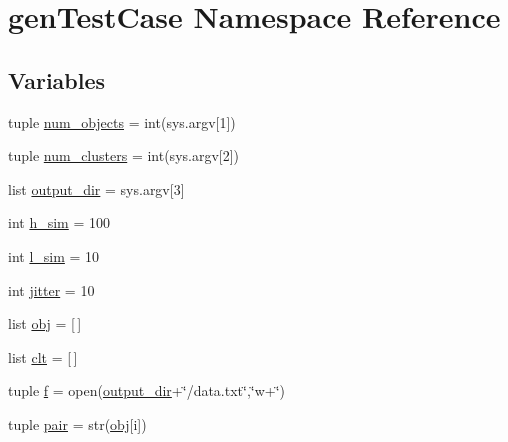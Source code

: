 \hypertarget{namespacegenTestCase}{\section{gen\-Test\-Case Namespace Reference}
\label{namespacegenTestCase}
}
\subsection*{Variables}
\begin{DoxyCompactItemize}
\item 
tuple \hyperlink{namespacegenTestCase_aae9a7a96491ccd585c9d67ee2aff7387}{num\-\_\-objects} = int(sys.\-argv\mbox{[}1\mbox{]})
\item 
tuple \hyperlink{namespacegenTestCase_a0fe831ca87bbbde19c8e0145cc350cc5}{num\-\_\-clusters} = int(sys.\-argv\mbox{[}2\mbox{]})
\item 
list \hyperlink{namespacegenTestCase_aa8a0b42d363ab3e8c59ab0514e6a4f21}{output\-\_\-dir} = sys.\-argv\mbox{[}3\mbox{]}
\item 
int \hyperlink{namespacegenTestCase_a2552790ec7ff21584332bf7e69ed692d}{h\-\_\-sim} = 100
\item 
int \hyperlink{namespacegenTestCase_aa9c42bf08976665edc7dd18af7f77f3b}{l\-\_\-sim} = 10
\item 
int \hyperlink{namespacegenTestCase_ad5df9b35e01c29801872e92ff16b6dff}{jitter} = 10
\item 
list \hyperlink{namespacegenTestCase_ad5562d57d874cb6070897a29f65a5f89}{obj} = \mbox{[}$\,$\mbox{]}
\item 
list \hyperlink{namespacegenTestCase_aeedf530d2d45ab93335c9416ff8b7c14}{clt} = \mbox{[}$\,$\mbox{]}
\item 
tuple \hyperlink{namespacegenTestCase_a9ca5030599b19855db5987a41590e693}{f} = open(\hyperlink{namespacegenTestCase_aa8a0b42d363ab3e8c59ab0514e6a4f21}{output\-\_\-dir}+\char`\"{}/data.\-txt\char`\"{},\char`\"{}w+\char`\"{})
\item 
tuple \hyperlink{namespacegenTestCase_a7222cb3c4de837afb0a128f5841711a4}{pair} = str(\hyperlink{namespacegenTestCase_ad5562d57d874cb6070897a29f65a5f89}{obj}\mbox{[}i\mbox{]})
\end{DoxyCompactItemize}


